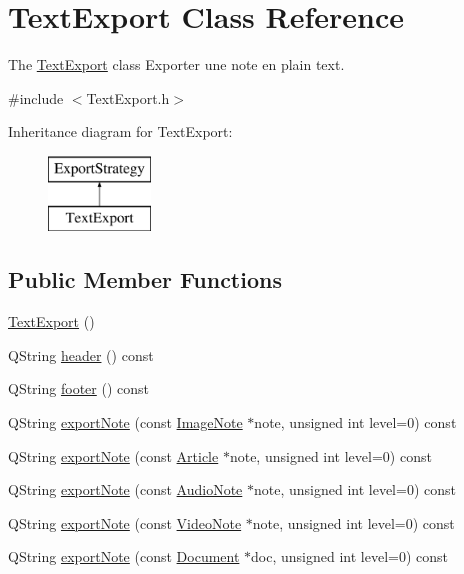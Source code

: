 \hypertarget{class_text_export}{\section{Text\-Export Class Reference}
\label{class_text_export}
}


The \hyperlink{class_text_export}{Text\-Export} class Exporter une note en plain text.  




{\ttfamily \#include $<$Text\-Export.\-h$>$}

Inheritance diagram for Text\-Export\-:\begin{figure}[H]
\begin{center}
\leavevmode
\includegraphics[height=2.000000cm]{class_text_export}
\end{center}
\end{figure}
\subsection*{Public Member Functions}
\begin{DoxyCompactItemize}
\item 
\hyperlink{class_text_export_aa18336d68c8b12866be83e5e0e2e6737}{Text\-Export} ()
\item 
Q\-String \hyperlink{class_text_export_a1fc1534c98477ae9bb07a6763e760f88}{header} () const 
\item 
Q\-String \hyperlink{class_text_export_af508443d5f02d032653e6a496c62ba96}{footer} () const 
\item 
Q\-String \hyperlink{class_text_export_afac4f9b7bab1151701541c5fcecf0c8a}{export\-Note} (const \hyperlink{class_image_note}{Image\-Note} $\ast$note, unsigned int level=0) const 
\item 
Q\-String \hyperlink{class_text_export_ae750e0187771a24a47bf2ad6c27f1975}{export\-Note} (const \hyperlink{class_article}{Article} $\ast$note, unsigned int level=0) const 
\item 
Q\-String \hyperlink{class_text_export_ac89822384b5acdc4bbf76e5f78ad1cc9}{export\-Note} (const \hyperlink{class_audio_note}{Audio\-Note} $\ast$note, unsigned int level=0) const 
\item 
Q\-String \hyperlink{class_text_export_ad924a2a1fd9fb2fcea7ac36d18f443bb}{export\-Note} (const \hyperlink{class_video_note}{Video\-Note} $\ast$note, unsigned int level=0) const 
\item 
Q\-String \hyperlink{class_text_export_a394c75275ef9731ea02a877e99ed7f23}{export\-Note} (const \hyperlink{class_document}{Document} $\ast$doc, unsigned int level=0) const 
\end{DoxyCompactItemize}
